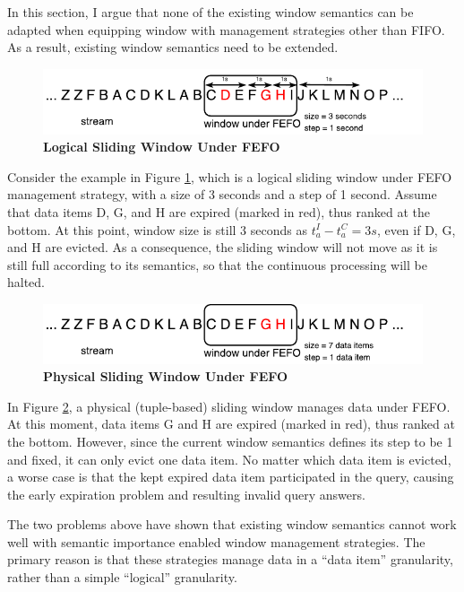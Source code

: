 In this section, I argue that none of the existing window semantics can be adapted when equipping window with management strategies other than FIFO.  
As a result, existing window semantics need to be extended. 

\begin{figure}[!htbp]
	\centering
    \includegraphics[width=5in]{img/3-wsti.pdf}
    \caption{\textbf{Logical Sliding Window Under FEFO}}
    \label{fig:3-wsti}
\end{figure}

Consider the example in Figure \ref{fig:3-wsti}, which is a logical sliding window under FEFO management strategy, with a size of 3 seconds and a step of 1 second. 
Assume that data items D, G, and H are expired (marked in red), thus ranked at the bottom. 
At this point, window size is still 3 seconds as $t^{I}_{a} - t^{C}_{a} = 3s$, even if D, G, and H are evicted.  
As a consequence, the sliding window will not move as it is still full according to its semantics, so that the continuous processing will be halted. 

\begin{figure}[!htbp]
	\centering
    \includegraphics[width=5in]{img/3-wstu.pdf}
    \caption{\textbf{Physical Sliding Window Under FEFO}}
    \label{fig:3-wstu}
\end{figure}

In Figure \ref{fig:3-wstu}, a physical (tuple-based) sliding window manages data under FEFO. 
At this moment, data items G and H are expired (marked in red), thus ranked at the bottom. 
However, since the current window semantics defines its step to be 1 and fixed, it can only evict one data item. 
No matter which data item is evicted, a worse case is that the kept expired data item participated in the query, causing the early expiration problem and resulting invalid query answers. 

The two problems above have shown that existing window semantics cannot work well with semantic importance enabled window management strategies. 
The primary reason is that these strategies manage data in a ``data item'' granularity, rather than a simple ``logical'' granularity. 
%
